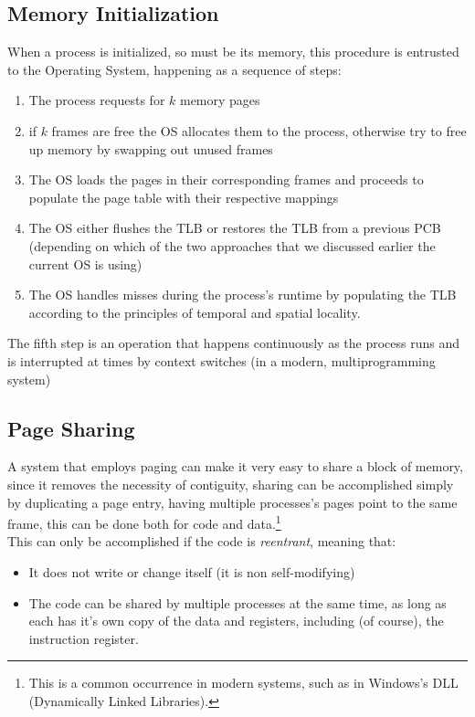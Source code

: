 \documentclass[openright, twoside]{report}
\theoremstyle{definition}
\theoremstyle{example}
\begin{document}
\subsection{Memory Initialization}
When a process is initialized, so must be its memory, this procedure is entrusted to 
the Operating System, happening as a sequence of steps:

\begin{enumerate}
	\item The process requests for $k$ memory pages
	\item if $k$ frames are free the OS allocates them to the process, otherwise try to free up memory 
	by swapping out unused frames
	\item The OS loads the pages in their corresponding frames and proceeds to populate the 
	page table with their respective mappings
	\item The OS either flushes the TLB or restores the TLB from a previous PCB (depending on which of the 
	two approaches that we discussed earlier the current OS is using)
	\item The OS handles misses during the process's runtime by populating the TLB according to 
	the principles of temporal and spatial locality.
\end{enumerate}

The fifth step is an operation that happens continuously as the process runs and is 
interrupted at times by context switches (in a modern, multiprogramming system)

\subsection{Page Sharing}
A system that employs paging can make it very easy to share a block of memory, since it 
removes the necessity of contiguity, sharing can be accomplished simply by duplicating a page 
entry, having multiple processes's pages point to the same frame, this can be done 
both for code and data.\footnote{This is a common occurrence in modern systems, such as in 
Windows's DLL (Dynamically Linked Libraries).}\\

This can only be accomplished if the code is \emph{reentrant}, meaning that:
\begin{itemize}
	\item It does not write or change itself (it is non self-modifying)
	\item The code can be shared by multiple processes at the same time, as long as each 
	has it's own copy of the data and registers, including (of course), the instruction register.
\end{itemize}
\end{document}
